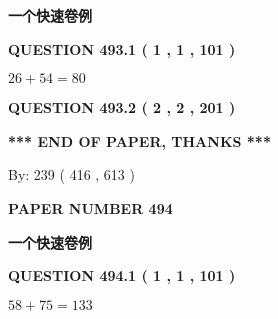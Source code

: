 \documentclass{ctexart}
\begin{document}
   
   
   
   
   
 \vspace{0.2in}
{\LARGE {\textbf{ 一个快速卷例}}}
   
   
  
\vspace{0.2in}
  
{\textbf{\Large{QUESTION
493.1 
 ( 1 , 1 , 101 )
}}}
  
  
 
 

$ %
26 +  %
54=   %
80$
 
 
  
\vspace{0.2in}
  
{\textbf{\Large{QUESTION
493.2 
 ( 2 , 2 , 201 )
}}}
  
  
   
   
 \vspace{0.2in}
 
   
   
   
   
\vspace{1.0in} 
{\textbf{\large{ *** END OF PAPER, THANKS *** }}} 
   
   
\hspace{1.0in} By: 
 239 ( 416 ,  613 )
   
   
   
   
\newpage 
\setcounter{page}{ 
   494001 } 
   
   
   
   
 {\textbf{ \Large{ PAPER NUMBER  494  }}}
   
   
\vspace{0.2in}
   
   
   
   
   
   
 \vspace{0.2in}
{\LARGE {\textbf{ 一个快速卷例}}}
   
   
  
\vspace{0.2in}
  
{\textbf{\Large{QUESTION
494.1 
 ( 1 , 1 , 101 )
}}}
  
  
 
 

$ %
58 +  %
75=   %
133$
 
\end{document}
